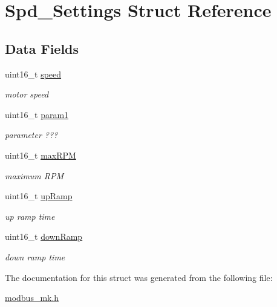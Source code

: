 \hypertarget{struct_spd___settings}{\section{Spd\+\_\+\+Settings Struct Reference}
\label{struct_spd___settings}
}
\subsection*{Data Fields}
\begin{DoxyCompactItemize}
\item 
\hypertarget{struct_spd___settings_a59ce628eaf3b710aa50afbe015ff0898}{uint16\+\_\+t \hyperlink{struct_spd___settings_a59ce628eaf3b710aa50afbe015ff0898}{speed}}\label{struct_spd___settings_a59ce628eaf3b710aa50afbe015ff0898}

\begin{DoxyCompactList}\small\item\em motor speed \end{DoxyCompactList}\item 
\hypertarget{struct_spd___settings_a402baa8e8a697bbf87de1ed4cf9f6627}{uint16\+\_\+t \hyperlink{struct_spd___settings_a402baa8e8a697bbf87de1ed4cf9f6627}{param1}}\label{struct_spd___settings_a402baa8e8a697bbf87de1ed4cf9f6627}

\begin{DoxyCompactList}\small\item\em parameter ??? \end{DoxyCompactList}\item 
\hypertarget{struct_spd___settings_af47d1e0c9da2497e819c12ecf7a3b9d0}{uint16\+\_\+t \hyperlink{struct_spd___settings_af47d1e0c9da2497e819c12ecf7a3b9d0}{max\+R\+P\+M}}\label{struct_spd___settings_af47d1e0c9da2497e819c12ecf7a3b9d0}

\begin{DoxyCompactList}\small\item\em maximum R\+P\+M \end{DoxyCompactList}\item 
\hypertarget{struct_spd___settings_a16f1cc3f4021c8e8cd8e14175ac0ba88}{uint16\+\_\+t \hyperlink{struct_spd___settings_a16f1cc3f4021c8e8cd8e14175ac0ba88}{up\+Ramp}}\label{struct_spd___settings_a16f1cc3f4021c8e8cd8e14175ac0ba88}

\begin{DoxyCompactList}\small\item\em up ramp time \end{DoxyCompactList}\item 
\hypertarget{struct_spd___settings_a19db5e7c4993f3f2343d27998c3c9e5a}{uint16\+\_\+t \hyperlink{struct_spd___settings_a19db5e7c4993f3f2343d27998c3c9e5a}{down\+Ramp}}\label{struct_spd___settings_a19db5e7c4993f3f2343d27998c3c9e5a}

\begin{DoxyCompactList}\small\item\em down ramp time \end{DoxyCompactList}\end{DoxyCompactItemize}


The documentation for this struct was generated from the following file\+:\begin{DoxyCompactItemize}
\item 
\hyperlink{modbus__mk_8h}{modbus\+\_\+mk.\+h}\end{DoxyCompactItemize}
